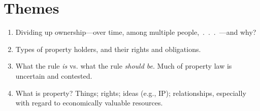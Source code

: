 \section{Themes}

\begin{enumerate}
    \item Dividing up ownership---over time, among multiple 
    people,~.~.~.~---and why?
    \item Types of property holders, and their rights and obligations.
    \item What the rule \emph{is} vs. what the rule \emph{should be}. Much of 
    property law is uncertain and contested.
    \item What is property? Things; rights; ideas (e.g., IP); relationships, 
    especially with regard to economically valuable resources.
\end{enumerate}
